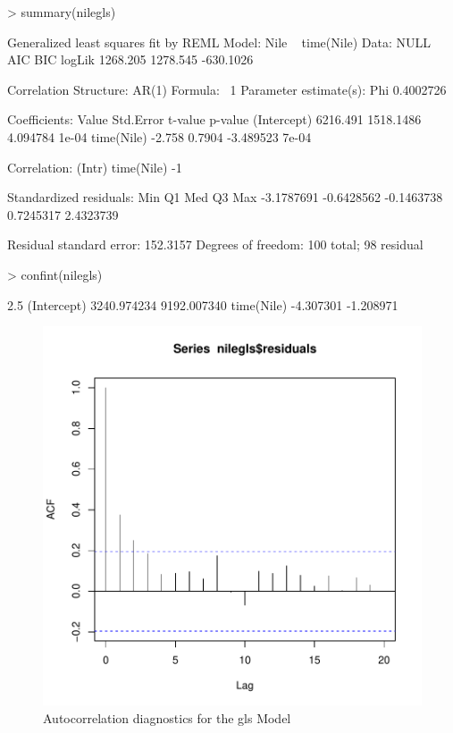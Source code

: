 \documentclass[10pt, a4paper]{article} %
\begin{document}
\begin{Schunk}
\begin{Sinput}
> summary(nilegls)
\end{Sinput}
\begin{Soutput}
Generalized least squares fit by REML
  Model: Nile ~ time(Nile) 
  Data: NULL 
       AIC      BIC    logLik
  1268.205 1278.545 -630.1026

Correlation Structure: AR(1)
 Formula: ~1 
 Parameter estimate(s):
      Phi 
0.4002726 

Coefficients:
               Value Std.Error   t-value p-value
(Intercept) 6216.491 1518.1486  4.094784   1e-04
time(Nile)    -2.758    0.7904 -3.489523   7e-04

 Correlation: 
           (Intr)
time(Nile) -1    

Standardized residuals:
       Min         Q1        Med         Q3        Max 
-3.1787691 -0.6428562 -0.1463738  0.7245317  2.4323739 

Residual standard error: 152.3157 
Degrees of freedom: 100 total; 98 residual
\end{Soutput}
\begin{Sinput}
> confint(nilegls)
\end{Sinput}
\begin{Soutput}
                  2.5 %
(Intercept) 3240.974234 9192.007340
time(Nile)    -4.307301   -1.208971
\end{Soutput}
\end{Schunk}

\begin{figure}[h]
\centering

\includegraphics{FINAL_VERSION-090}
\caption{Autocorrelation diagnostics for the gls Model}
\end{figure}
\end{document}
